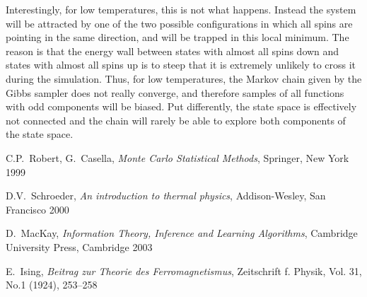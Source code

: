 \documentclass[a4paper, draft]{article}
\theoremstyle{own}
\theoremstyle{remark}
\begin{document}
Interestingly, for low temperatures, this is not what happens. Instead the system will be attracted by one of the two possible configurations in which all spins are pointing in the same direction, and will be trapped in this local minimum. The reason is that the energy wall between states with almost all spins down and states with almost all spins up is to steep that it is extremely unlikely to cross it during the simulation. Thus, for low temperatures, the Markov chain given by the Gibbs sampler does not really converge, and therefore samples of all functions with odd components will be biased. Put differently, the state space is effectively not connected and the chain will rarely be able to explore both components of the state space.




\begin{thebibliography}{9}
	


C.P.~Robert, G.~Casella,
{\em Monte Carlo Statistical Methods},
Springer, New York 1999


D.V.~Schroeder,
{\em An introduction to thermal physics},
Addison-Wesley, San Francisco 2000

D.~MacKay,
{\em Information Theory, Inference and Learning Algorithms},
Cambridge University Press, Cambridge 2003

E.~Ising,
{\em Beitrag zur Theorie des Ferromagnetismus},
Zeitschrift f. Physik, Vol. 31, No.1 (1924), 253--258

\end{thebibliography}
\end{document}
